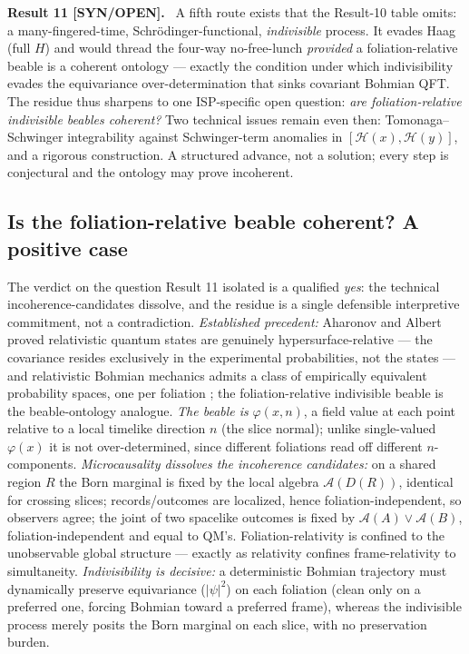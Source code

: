 \documentclass[aps,prd,preprint,amsmath,amssymb,nofootinbib,superscriptaddress]{revtex4-2}
\newenvironment{result}[1]{\par\medskip\noindent\textbf{#1}\ }{\par\medskip}
\begin{document}
\begin{result}{Result 11 [SYN/OPEN].}
A fifth route exists that the Result-10 table omits: a many-fingered-time, Schr\"odinger-functional,
\emph{indivisible} process. It evades Haag (full $H$) and would thread the four-way no-free-lunch
\emph{provided} a foliation-relative beable is a coherent ontology --- exactly the condition under
which indivisibility evades the equivariance over-determination that sinks covariant Bohmian QFT.
The residue thus sharpens to one ISP-specific open question: \emph{are foliation-relative indivisible
beables coherent?} Two technical issues remain even then: Tomonaga--Schwinger integrability against
Schwinger-term anomalies in $[\mathcal H(x),\mathcal H(y)]$, and a rigorous construction. A structured
advance, not a solution; every step is conjectural and the ontology may prove incoherent.
\end{result}

\subsection{Is the foliation-relative beable coherent? A positive case}
The verdict on the question Result 11 isolated is a qualified \emph{yes}: the technical
incoherence-candidates dissolve, and the residue is a single defensible interpretive
commitment, not a contradiction. \emph{Established precedent:} Aharonov and Albert
\cite{AharonovAlbert1980} proved relativistic quantum states are genuinely
hypersurface-relative --- the covariance resides exclusively in the experimental
probabilities, not the states --- and relativistic Bohmian mechanics admits a class of
empirically equivalent probability spaces, one per foliation \cite{DurrEtAl2014}; the
foliation-relative indivisible beable is the beable-ontology analogue. \emph{The beable is}
$\varphi(x,n)$, a field value at each point relative to a local timelike direction $n$ (the
slice normal); unlike single-valued $\varphi(x)$ it is not over-determined, since different
foliations read off different $n$-components. \emph{Microcausality dissolves the incoherence
candidates:} on a shared region $R$ the Born marginal is fixed by the local algebra
$\mathcal A(D(R))$, identical for crossing slices; records/outcomes are localized, hence
foliation-independent, so observers agree; the joint of two spacelike outcomes is fixed by
$\mathcal A(A)\vee\mathcal A(B)$, foliation-independent and equal to QM's. Foliation-relativity
is confined to the unobservable global structure --- exactly as relativity confines
frame-relativity to simultaneity. \emph{Indivisibility is decisive:} a deterministic Bohmian
trajectory must dynamically preserve equivariance ($|\psi|^2$) on each foliation (clean only
on a preferred one, forcing Bohmian toward a preferred frame), whereas the indivisible process
merely posits the Born marginal on each slice, with no preservation burden.
\end{document}
